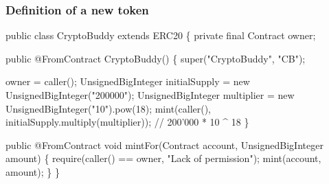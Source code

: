 \documentclass[11pt]{beamer}  %
\begin{document}
\begin{frame}[fragile]\frametitle{Definition of a new token}

{\scriptsize\begin{semiverbatim}
public class {\color{red}CryptoBuddy extends ERC20} \{
  private final Contract owner;

  public {\color{red}@FromContract} CryptoBuddy() \{
    super("CryptoBuddy", "CB");

    owner = caller();
    UnsignedBigInteger initialSupply = new UnsignedBigInteger("200000");
    UnsignedBigInteger multiplier = new UnsignedBigInteger("10").pow(18);
    mint(caller(), initialSupply.multiply(multiplier)); // 200'000 * 10 ^ 18
  \}

  public @FromContract void mintFor(Contract account, UnsignedBigInteger amount) \{
    require(caller() == owner, {\color{armygreen}"Lack of permission"});
    mint(account, amount);
  \}
\}
\end{semiverbatim}}

\end{frame}
\end{document}
